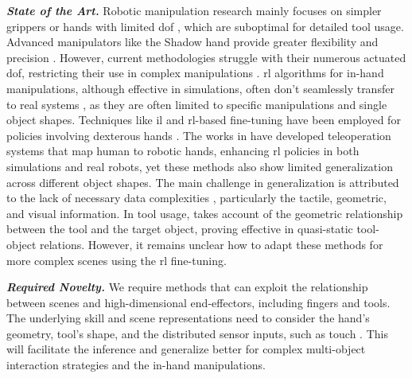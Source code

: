 \documentclass{erc-B2}
\begin{document}
\textit{\textbf{State of the Art.}}
Robotic manipulation research mainly focuses on simpler grippers or hands with limited \gls*{dof} \cite{chen2023development, saloutos2023towards, cairnes2023overview}, which are suboptimal for detailed tool usage. Advanced manipulators like the Shadow hand provide greater flexibility and precision  \cite{negrello2020hands}. However, current methodologies struggle with their numerous actuated \gls*{dof}, restricting their use in complex manipulations \cite{liu2022herd, Li2022Survey, kadalagere2023Review}. \gls*{rl} algorithms for in-hand manipulations, although effective in simulations, often don't seamlessly transfer to real systems \cite{shadowhand}, as they are often limited to specific manipulations and single object shapes.
Techniques like \gls*{il} and \gls*{rl}-based fine-tuning have been employed for policies involving dexterous hands \cite{Rajeswaran2018Dexterous}. The works in \cite{qin2022from, qin2021dexmv} have developed teleoperation systems that map human to robotic hands, enhancing \gls*{rl} policies in both simulations and real robots, yet these methods also show limited generalization across different object shapes.
The main challenge in generalization is attributed to the lack of necessary data complexities \cite{navarro2023visuo}, particularly the tactile, geometric, and visual information. In tool usage, \cite{Jianfeng2023KVIL} takes account of the geometric relationship between the tool and the target object,  proving effective in quasi-static tool-object relations. However, it remains unclear how to adapt these methods for more complex scenes using the \gls*{rl} fine-tuning.

\textit{\textbf{Required Novelty.}} 
We require methods that can exploit the relationship between scenes and high-dimensional end-effectors, including fingers and tools. 
The underlying skill and scene representations need to consider the hand's geometry, tool's shape, and the distributed sensor inputs, such as touch \cite{ward2018tactip, lambeta2020digit, pan2022task}. This will facilitate the inference and generalize better for complex multi-object interaction strategies and the in-hand manipulations.
\end{document}
